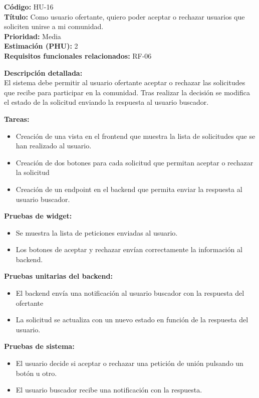 \begin{tarjetaHU}
\textbf{Código:} HU-16 \\
\textbf{Título:} Como usuario ofertante, quiero poder aceptar o rechazar usuarios que soliciten unirse a mi comunidad. \\
\textbf{Prioridad:} Media \\
\textbf{Estimación (PHU):} 2 \\
\textbf{Requisitos funcionales relacionados:} RF-06

\vspace{0.5em}
\textbf{Descripción detallada:} \\
El sistema debe permitir al usuario ofertante aceptar o rechazar las solicitudes que recibe para participar en la comunidad. Tras realizar la decisión se modifica el estado de la solicitud enviando la respuesta al usuario buscador.

\vspace{0.5em}
\textbf{Tareas:}
\begin{itemize}[left=0pt]
  \item Creación de una vista en el frontend que muestra la lista de solicitudes que se han realizado al usuario.
  \item Creación de dos botones para cada solicitud que permitan aceptar o rechazar la solicitud
  \item Creación de un endpoint en el backend que permita enviar la respuesta al usuario buscador.
\end{itemize}

\vspace{0.5em}
\textbf{Pruebas de widget:}
\begin{itemize}[left=0pt]
    \item Se muestra la lista de peticiones enviadas al usuario.
    \item Los botones de aceptar y rechazar envían correctamente la información al backend.
\end{itemize}
\textbf{Pruebas unitarias del backend:}
\begin{itemize}[left=0pt]
  \item El backend envía una notificación al usuario buscador con la respuesta del ofertante
  \item La solicitud se actualiza con un nuevo estado en función de la respuesta del usuario.

\end{itemize}
\textbf{Pruebas de sistema:}
\begin{itemize}[left=0pt]
    \item El usuario decide si aceptar o rechazar una petición de unión pulsando un botón u otro.
    \item El usuario buscador recibe una notificación con la respuesta.
\end{itemize}
\end{tarjetaHU}

